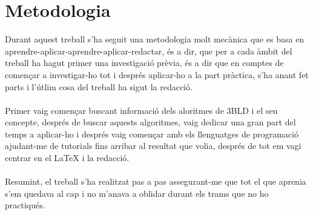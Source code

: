 \pagestyle{Metodologia}
\part*{Metodologia}

Durant aquest treball s'ha seguit una metodologia molt mecànica que es basa en aprendre-aplicar-aprendre-aplicar-redactar, és a dir, que per a cada àmbit del treball ha hagut primer una investigació prèvia, és a dir que en comptes de començar a investigar-ho tot i després aplicar-ho a la part pràctica, s'ha anant fet parts i l'útlim cosa del treball ha sigut la redacció.
\\\\Primer vaig començar buscant informació dels aloritmes de 3BLD i el seu concepte, després de buscar aquests algoritmes, vaig dedicar una gran part del temps a aplicar-ho i després vaig començar amb els llenguatges de programació ajudant-me de tutorials fins arribar al resultat que volia, després de tot em vagi centrar en el LaTeX i la redacció.
\\\\Resumint, el treball s'ha realitzat pas a pas assegurant-me que tot el que aprenia s'em quedava al cap i no m'anava a oblidar durant els trams que no ho practiqués.